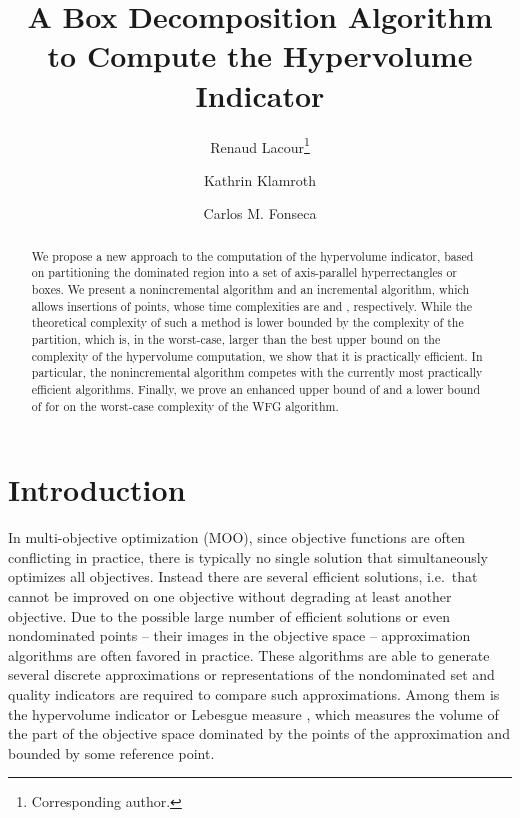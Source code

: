\documentclass[a4paper,11pt]{article}
\begin{document}
\title{A Box Decomposition Algorithm\\ to Compute the Hypervolume Indicator}
\author[1]{Renaud Lacour\footnote{Corresponding author.}}
\author[1]{Kathrin Klamroth}
\author[2]{Carlos M. Fonseca}
\maketitle


\begin{abstract}
We propose a new approach to the computation of the hypervolume indicator,
based on partitioning the dominated region into a set of axis-parallel hyperrectangles or boxes.
We present a nonincremental algorithm and an incremental algorithm, 
which allows insertions of points,
whose time complexities are 
and , respectively.
While the theoretical complexity of such a method is lower bounded
by the complexity of the partition, which is, 
in the worst-case, larger than the best upper bound on 
the complexity of the hypervolume computation,
we show that it is practically efficient.
In particular, the nonincremental algorithm competes with the currently
most practically efficient algorithms.
Finally, we prove an enhanced upper bound of 
and a lower bound of 
for 
on the worst-case complexity of the WFG algorithm.

\end{abstract}


\section{Introduction}

In multi-objective optimization (MOO), since objective functions are often conflicting in practice, 
there is typically no single solution that simultaneously optimizes all objectives.
Instead there are several efficient solutions, 
i.e.\  that cannot be improved on one objective without degrading at least another objective.
Due to the possible large number of efficient solutions or even nondominated points 
-- their images in the objective space --
approximation algorithms are often favored in practice.
These algorithms are able to generate several discrete approximations or representations 
of the nondominated set and quality indicators are required to compare such approximations.
Among them is the hypervolume indicator or Lebesgue measure \citep[see e.g.][]{ZitThi98}, 
which measures the volume of the part of the objective space dominated by the points
of the approximation and bounded by some reference point. 
\end{document}
